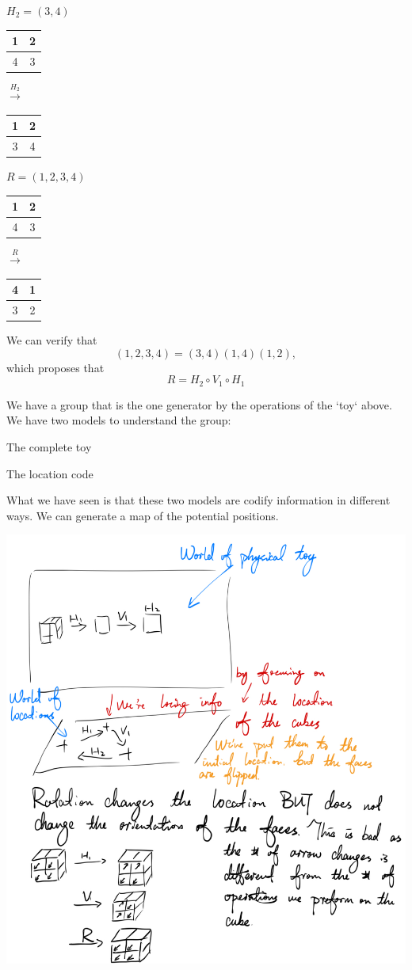 \begin{example}
\begin{listu}
        \item $H_2 = (3, 4)$
        \begin{center} 
            \begin{tabular}{c|c} 1 & 2 \\ \hline 4 & 3 \end{tabular}
            \quad$\xrightarrow{H_2}$\quad
            \begin{tabular}{c|c} 1 & 2 \\ \hline 3 & 4 \end{tabular}
        \end{center}


        \item $R = (1, 2, 3, 4)$
        \begin{center} 
            \begin{tabular}{c|c} 1 & 2 \\ \hline 4 & 3 \end{tabular}
            \quad$\xrightarrow{R}$\quad
            \begin{tabular}{c|c} 4 & 1 \\ \hline 3 & 2 \end{tabular}
        \end{center}
    \end{listu}

    We can verify that \[
        (1, 2, 3, 4) = (3, 4)(1, 4)(1, 2),
    \] which proposes that \[
        R = H_2 \circ V_1 \circ H_1
    \]

\end{example}

We have a group that is the one generator by the operations of the `toy` above. We have two models to understand the group: \begin{listo}
    \item The complete toy 
    \item The location code
\end{listo} What we have seen is that these two models are codify information in different ways. We can generate a map of the potential positions. 


\begin{center}
    \includegraphics[width=0.55\linewidth]{figures/rubics-cube-1.png}
\end{center}

